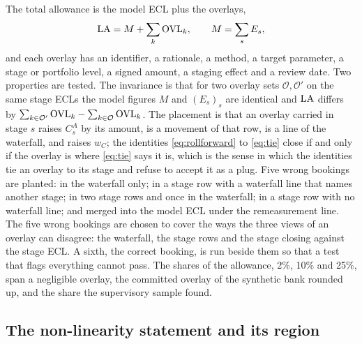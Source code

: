 The total allowance is the model ECL plus the overlays,
\begin{equation}
\mathrm{LA}=M+\sum_{k}\mathrm{OVL}_{k},\qquad M=\sum_{s}E_{s},
\label{eq:allowance}
\end{equation}
and each overlay has an identifier, a rationale, a method, a target parameter, a stage or portfolio level, a signed amount, a staging effect and a review date.
Two properties are tested.
The invariance is that for two overlay sets $\mathcal{O},\mathcal{O}'$ on the same stage ECLs the model figures $M$ and $(E_s)_s$ are identical and $\mathrm{LA}$ differs by $\sum_{k\in\mathcal{O}'}\mathrm{OVL}_k-\sum_{k\in\mathcal{O}}\mathrm{OVL}_k$.
The placement is that an overlay carried in stage $s$ raises $C^{A}_{s}$ by its amount, is a movement of that row, is a line of the waterfall, and raises $w_C$; the identities \eqref{eq:rollforward} to \eqref{eq:tie} close if and only if the overlay is where \eqref{eq:tie} says it is, which is the sense in which the identities tie an overlay to its stage and refuse to accept it as a plug.
Five wrong bookings are planted: in the waterfall only; in a stage row with a waterfall line that names another stage; in two stage rows and once in the waterfall; in a stage row with no waterfall line; and merged into the model ECL under the remeasurement line.
The five wrong bookings are chosen to cover the ways the three views of an overlay can disagree: the waterfall, the stage rows and the stage closing against the stage ECL.
A sixth, the correct booking, is run beside them so that a test that flags everything cannot pass.
The shares of the allowance, 2\%, 10\% and 25\%, span a negligible overlay, the committed overlay of the synthetic bank rounded up, and the share the supervisory sample found.

\subsection{The non-linearity statement and its region}
\label{sec:method-nonlinearity}

